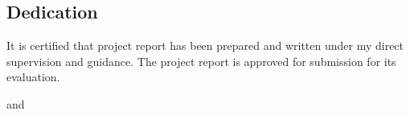 \begin{center}
  \section*{Dedication}
\end{center}

\begin{spacing}{1.5}
  It is certified that project report has been prepared and written under my direct supervision and guidance. The project report is approved for submission for its evaluation.
\end{spacing}

\begin{flushright}
  {\firststudentname} and {\secondstudentname}
\end{flushright}

\clearpage
\vspace*{2cm}
